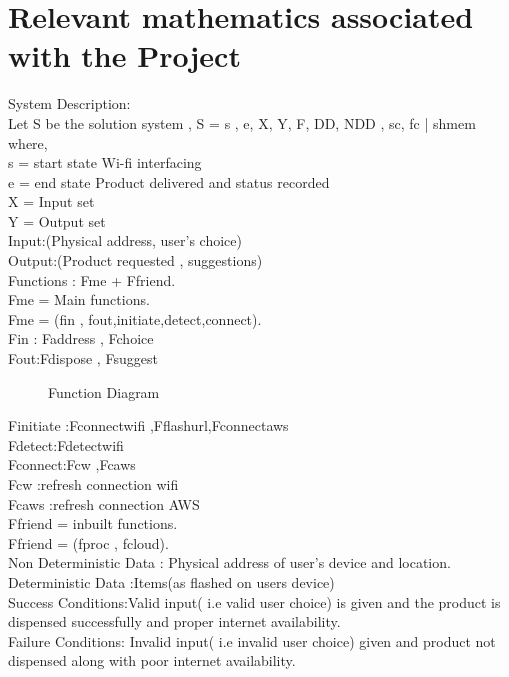 \documentclass[oneside,a4paper,12pt]{report}
\begin{document}
\section{Relevant mathematics associated with the Project}
\label{sec:math}
System Description:\\
 Let S be the solution system ,
	  S = {s , e, X, Y, F, DD, NDD , sc, fc | shmem}\\
            where,    \\   
s = start state {Wi-fi interfacing}\\
e = end state { Product delivered and status recorded}\\
X = Input set\\
Y = Output set\\
Input:(Physical address, user’s choice)	\\ 
Output:(Product requested , suggestions)\\ 
Functions : Fme + Ffriend.\\
Fme = Main functions.\\
Fme = (fin , fout,initiate,detect,connect).\\
Fin : {Faddress , Fchoice}\\
Fout:{Fdispose , Fsuggest}\\
\begin{center}
	\begin{figure}[!htbp]
		\centering
	  \caption{Function Diagram}
	  \label{fig:act-dig}
	\end{figure}
\end{center}  
Finitiate :{Fconnectwifi ,Fflashurl,Fconnectaws}\\
Fdetect:{Fdetectwifi}\\
Fconnect:{Fcw ,Fcaws}\\
Fcw :refresh connection wifi\\
Fcaws :refresh connection AWS\\
Ffriend = inbuilt functions.\\
Ffriend = (fproc , fcloud).\\
Non Deterministic Data : Physical address of user's device and location.\\
Deterministic Data :Items(as flashed on users device)\\
Success Conditions:Valid input( i.e valid user choice) is given and the product is dispensed successfully and proper internet availability.\\
Failure Conditions: Invalid input( i.e invalid user choice)  given and product not dispensed along with poor internet availability.\\
\end{document}
